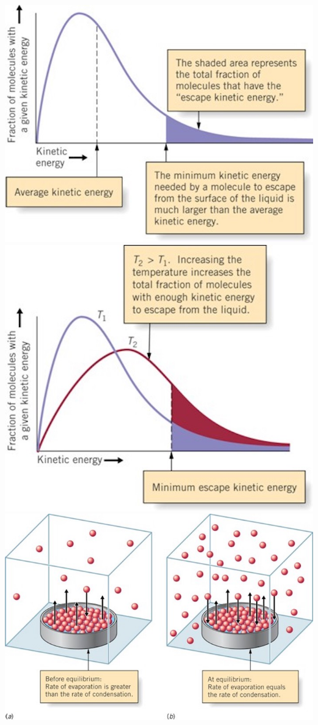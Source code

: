 \documentclass[
  letterpaper,
  DIV=11,
  numbers=noendperiod]{scrreprt}
\begin{document}
\includegraphics{archive/figures/evaporation_slide0.jpg}
\includegraphics{archive/figures/evaporation_slide1.jpg}
\includegraphics{archive/figures/evaporation_slide2.jpg}
\end{document}
